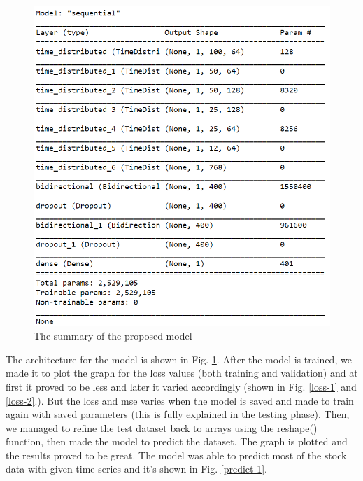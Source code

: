 \documentclass[conference]{IEEEtran}
\begin{document}
\begin{figure}[htbp]
\centerline{\includegraphics[scale=0.5]{model_arch-1.png}}
\caption{The summary of the proposed model}
\label{model}
\end{figure}

The architecture for the model is shown in Fig. \ref{model}. After the model is trained, we made it to plot the graph for the loss values (both training and validation) and at first it proved to be less and later it varied accordingly (shown in Fig. \ref{loss-1} and \ref{loss-2}.). But the loss and mse varies when the model is saved and made to train again with saved parameters (this is fully explained in the testing phase). Then, we managed to refine the test dataset back to arrays using the reshape() function, then made the model to predict the dataset. The graph is plotted and the results proved to be great. The model was able to predict most of the stock data with given time series and it's shown in Fig. \ref{predict-1}. 
\end{document}
